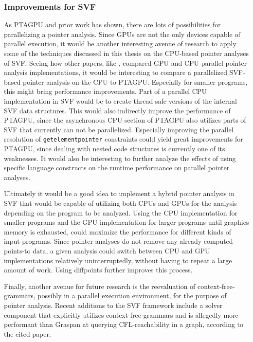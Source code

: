 \subsubsection{Improvements for SVF}
As PTAGPU and prior work has shown, there are lots of possibilities for parallelizing a pointer analysis.
Since GPUs are not the only devices capable of parallel execution, it would be another interesting avenue of research to apply some of the techniques discussed in this thesis on the CPU-based pointer analyses of SVF.
Seeing how other papers, like \cite{mendez2012gpu}, compared GPU and CPU parallel pointer analysis implementations, it would be interesting to compare a parallelized SVF-based pointer analysis on the CPU to PTAGPU. Especially for smaller programs, this might bring performance improvements.
Part of a parallel CPU implementation in SVF would be to create thread safe versions of the internal SVF data structures.
This would also indirectly improve the performance of PTAGPU, since the asynchronous CPU section of PTAGPU also utilizes parts of SVF that currently can not be parallelized.
Especially improving the parallel resolution of \verb|getelementpointer| constraints could yield great improvements for PTAGPU, since dealing with nested code structures is currently one of its weaknesses.
It would also be interesting to further analyze the effects of using specific language constructs on the runtime performance on parallel pointer analyses.

Ultimately it would be a good idea to implement a hybrid pointer analysis in SVF that would be capable of utilizing both CPUs and GPUs for the analysis depending on the program to be analyzed.
Using the CPU implementation for smaller programs and the GPU implementation for larger programs until graphics memory is exhausted, could maximize the performance for different kinds of input programs.
Since pointer analyses do not remove any already computed points-to data, a given analysis could switch between CPU and GPU implementations relatively uninterruptedly, without having to repeat a large amount of work.
Using diffpoints further improves this process.

Finally, another avenue for future research is the reevaluation of context-free-grammars, possibly in a parallel execution environment, for the purpose of pointer analysis.
Recent additions to the SVF framework include a solver component that explicitly utilizes context-free-grammars \cite{lei2022taming} and is allegedly more performant than Graspan at querying CFL-reachability in a graph, according to the cited paper.
